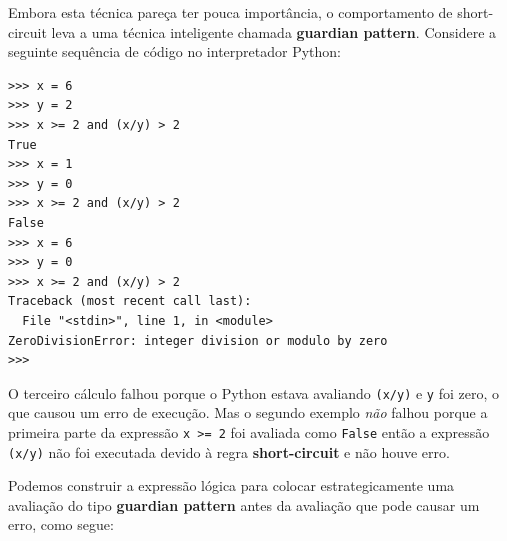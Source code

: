 
Embora esta técnica pareça ter pouca importância, o comportamento de short-circuit
leva a uma técnica inteligente chamada {\bf guardian pattern}.
Considere a seguinte sequência de código no interpretador Python:

\beforeverb
\begin{verbatim}
>>> x = 6 
>>> y = 2
>>> x >= 2 and (x/y) > 2
True
>>> x = 1 
>>> y = 0
>>> x >= 2 and (x/y) > 2
False
>>> x = 6
>>> y = 0
>>> x >= 2 and (x/y) > 2
Traceback (most recent call last):
  File "<stdin>", line 1, in <module>
ZeroDivisionError: integer division or modulo by zero
>>> 
\end{verbatim}
\afterverb
%
O terceiro cálculo falhou porque o Python estava avaliando {\tt (x/y)}
e {\tt y} foi zero, o que causou um erro de execução. Mas o segundo exemplo
\emph{não} falhou porque a primeira parte da expressão {\tt x >= 2} foi
avaliada como {\tt False} então a expressão {\tt (x/y)} não foi executada
devido à regra {\bf short-circuit} e não houve erro.



Podemos construir a expressão lógica para colocar estrategicamente uma avaliação 
do tipo {\bf guardian pattern} antes da avaliação que pode causar um erro, como segue:


